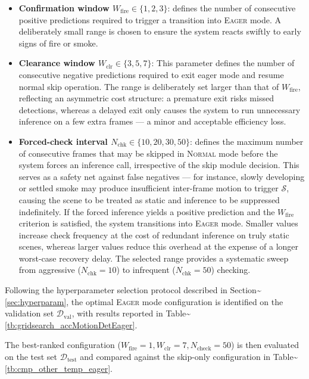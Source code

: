 \documentclass[
  10pt,
]{article}
\begin{document}
\begin{itemize}
\item
  \textbf{Confirmation window \(W_{\mathrm{fire}} \in \{1, 2, 3\}\)}:
  defines the number of consecutive positive predictions required to
  trigger a transition into \textsc{Eager} mode. A deliberately small
  range is chosen to ensure the system reacts swiftly to early signs of
  fire or smoke.
\item
  \textbf{Clearance window \(W_{\mathrm{clr}} \in \{3, 5, 7\}\)}: This
  parameter defines the number of consecutive negative predictions
  required to exit eager mode and resume normal skip operation. The
  range is deliberately set larger than that of \(W_{\mathrm{fire}}\),
  reflecting an asymmetric cost structure: a premature exit risks missed
  detections, whereas a delayed exit only causes the system to run
  unnecessary inference on a few extra frames --- a minor and acceptable
  efficiency loss.
\item
  \textbf{Forced-check interval
  \(N_{\mathrm{chk}} \in \{10, 20, 30, 50\}\)}: defines the maximum
  number of consecutive frames that may be skipped in \textsc{Normal}
  mode before the system forces an inference call, irrespective of the
  skip module decision. This serves as a safety net against false
  negatives --- for instance, slowly developing or settled smoke may
  produce insufficient inter-frame motion to trigger \(\mathcal{S}\),
  causing the scene to be treated as static and inference to be
  suppressed indefinitely. If the forced inference yields a positive
  prediction and the \(W_{\mathrm{fire}}\) criterion is satisfied, the
  system transitions into \textsc{Eager} mode. Smaller values increase
  check frequency at the cost of redundant inference on truly static
  scenes, whereas larger values reduce this overhead at the expense of a
  longer worst-case recovery delay. The selected range provides a
  systematic sweep from aggressive (\(N_{\mathrm{chk}} = 10\)) to
  infrequent (\(N_{\mathrm{chk}} = 50\)) checking.
\end{itemize}

Following the hyperparameter selection protocol described in
Section\textasciitilde{}\ref{sec:hyperparam}, the optimal \textsc{Eager}
mode configuration is identified on the validation set
\(\mathcal{D}_{\mathrm{val}}\), with results reported in
Table\textasciitilde{}\ref{tb:gridsearch_accMotionDetEager}.

The best-ranked configuration
(\(W_{\text{fire}} = 1, W_{\text{clr}} = 7, N_{\text{check}} = 50\)) is
then evaluated on the test set \(\mathcal{D}_{\text{test}}\) and
compared against the skip-only configuration in
Table\textasciitilde{}\ref{tb:cmp_other_temp_eager}.
\end{document}

